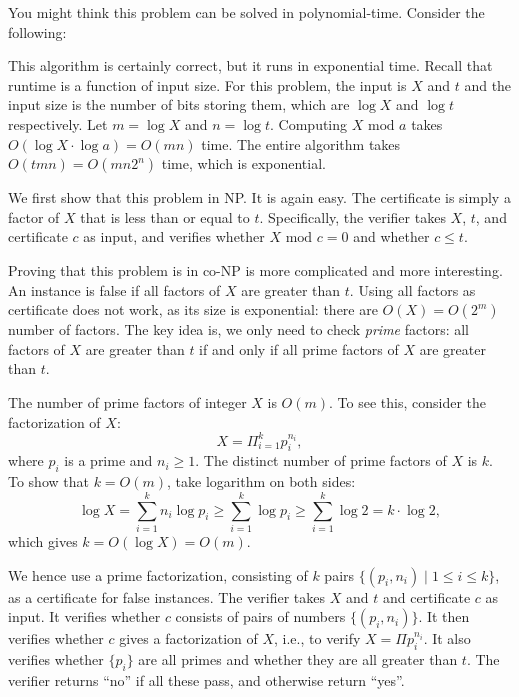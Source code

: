 You might think this problem can be solved in polynomial-time. Consider the following:

\begin{algorithmblock}[0.8\textwidth]
        \xxx
        \xxx
        \xxx
        \xxx
\end{algorithmblock}

This algorithm is certainly correct, but it runs in exponential time.
Recall that runtime is a function of input size.
For this problem, the input is $X$ and $t$ and the input size
is the number of bits storing them, which are $\log X$ and $\log t$ respectively.
Let $m = \log X$ and $n = \log t$.
Computing $X \textrm{ mod } a$ takes $O(\log X \cdot \log a) = O(mn)$ time.
The entire algorithm takes $O(tmn) = O(mn2^n)$ time, which is exponential.

We first show that this problem in NP. It is again easy.
The certificate is simply a factor of $X$ that is less than or equal to $t$.
Specifically, the verifier takes $X$, $t$, and certificate $c$ as input,
and verifies whether $X \textrm{ mod } c = 0$ and whether $c \le t$.

Proving that this problem is in co-NP is more complicated and more interesting.
An instance is false if all factors of $X$ are greater than $t$.
Using all factors as certificate does not work, as its size is exponential: 
there are $O(X) = O(2^m)$ number of factors.
The key idea is, we only need to check \emph{prime} factors: all factors of $X$ are greater than $t$
if and only if all prime factors of $X$ are greater than $t$.

The number of prime factors of integer $X$ is $O(m)$. To see this, consider the factorization of $X$:
$$X = \Pi_{i=1}^k p_i^{n_i},$$
where $p_i$ is a prime and $n_i \ge 1$. The distinct number of prime factors of $X$ is $k$.
To show that $k = O(m)$, take logarithm on both sides:
$$\log X = \sum_{i=1}^k n_i \log p_i \ge \sum_{i=1}^k \log p_i \ge \sum_{i=1}^k \log 2 = k\cdot \log 2,$$
which gives $k = O(\log X) = O(m)$.

We hence use a prime factorization, consisting of $k$ pairs $\{(p_i, n_i) \mid 1\le i \le k\}$, as a certificate for false instances.
The verifier takes $X$ and $t$ and certificate $c$ as input.
It verifies whether $c$ consists of pairs of numbers  $\{(p_i, n_i)\}$.
It then verifies whether $c$ gives a factorization of $X$, i.e., to verify $X = \Pi p_i^{n_i}$.
It also verifies whether $\{p_i\}$ are all primes and whether they are all greater than $t$.
The verifier returns ``no'' if all these pass, and otherwise return ``yes''.

